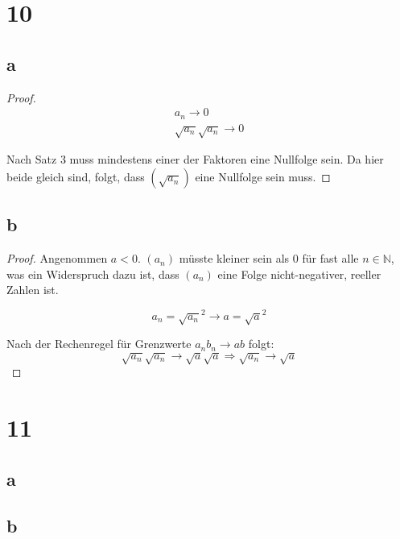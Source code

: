 \documentclass[a4paper,10pt]{article}
\begin{document}
\section*{10}

\subsection*{a}

\begin{proof}
 \begin{align*}
  a_n \rightarrow 0\\
  \sqrt{a_n}\sqrt{a_n} \rightarrow 0
 \end{align*}

 Nach Satz 3 muss mindestens einer der Faktoren eine Nullfolge sein.
 Da hier beide gleich sind, folgt, dass $(\sqrt{a_n})$ eine Nullfolge sein muss.
\end{proof}

\subsection*{b}

\begin{proof}
 Angenommen $a < 0$.
 $(a_n)$ müsste kleiner sein als $0$ für fast alle $n \in \mathbb{N}$, was ein Widerspruch dazu ist, dass $(a_n)$ eine Folge nicht-negativer, reeller Zahlen ist.
 
 \begin{equation*}
  a_n = \sqrt{a_n}^2 \rightarrow a = \sqrt{a}^2
 \end{equation*}
 
 Nach der Rechenregel für Grenzwerte $a_nb_n \rightarrow ab$ folgt:
 \begin{equation*}
  \sqrt{a_n}\sqrt{a_n} \rightarrow \sqrt{a}\sqrt{a} \Rightarrow \sqrt{a_n} \rightarrow \sqrt{a}
 \end{equation*}
\end{proof}

\section*{11}

\subsection*{a}



\subsection*{b}
\end{document}

